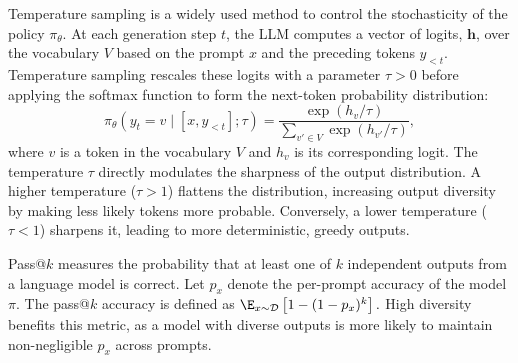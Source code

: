 Temperature sampling \citep{ACKLEY1985147} is a widely used method to control the stochasticity of the policy $\pi_\theta$. At each generation step $t$, the LLM computes a vector of logits, $\mathbf{h}$, over the vocabulary $V$ based on the prompt $x$ and the preceding tokens $y_{<t}$. Temperature sampling rescales these logits with a parameter $\tau > 0$ before applying the softmax function to form the next-token probability distribution:
$$
\pi_\theta(y_t = v \mid [x, y_{<t}]; \tau) = \frac{\exp(h_v / \tau)}{\sum_{v' \in V} \exp(h_{v'} / \tau)},
$$
where $v$ is a token in the vocabulary $V$ and $h_v$ is its corresponding logit. The temperature $\tau$ directly modulates the sharpness of the output distribution. A higher temperature ($\tau > 1$) flattens the distribution, increasing output diversity by making less likely tokens more probable. Conversely, a lower temperature ($\tau < 1$) sharpens it, leading to more deterministic, greedy outputs. 
%



Pass@$k$ measures the probability that at least one of $k$ independent outputs from a language model is correct. 
%
Let $p_x$ denote the per-prompt accuracy of the model $\pi$. The pass@$k$ accuracy is defined as $\E_{x\sim\mathcal{D}}\left[1-(1-p_x)^k\right].$
%
High diversity benefits this metric, as a model with diverse outputs is more likely to maintain non-negligible $p_x$ across prompts.
%

